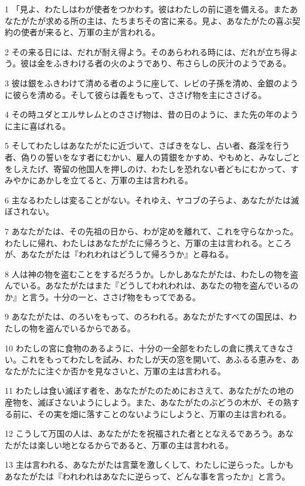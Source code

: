 \par 1 「見よ、わたしはわが使者をつかわす。彼はわたしの前に道を備える。またあなたがたが求める所の主は、たちまちその宮に来る。見よ、あなたがたの喜ぶ契約の使者が来ると、万軍の主が言われる。
\par 2 その来る日には、だれが耐え得よう。そのあらわれる時には、だれが立ち得よう。彼は金をふきわける者の火のようであり、布さらしの灰汁のようである。
\par 3 彼は銀をふきわけて清める者のように座して、レビの子孫を清め、金銀のように彼らを清める。そして彼らは義をもって、ささげ物を主にささげる。
\par 4 その時ユダとエルサレムとのささげ物は、昔の日のように、また先の年のように主に喜ばれる。
\par 5 そしてわたしはあなたがたに近づいて、さばきをなし、占い者、姦淫を行う者、偽りの誓いをなす者にむかい、雇人の賃銀をかすめ、やもめと、みなしごとをしえたげ、寄留の他国人を押しのけ、わたしを恐れない者どもにむかって、すみやかにあかしを立てると、万軍の主は言われる。
\par 6 主なるわたしは変ることがない。それゆえ、ヤコブの子らよ、あなたがたは滅ぼされない。
\par 7 あなたがたは、その先祖の日から、わが定めを離れて、これを守らなかった。わたしに帰れ、わたしはあなたがたに帰ろうと、万軍の主は言われる。ところが、あなたがたは『われわれはどうして帰ろうか』と尋ねる。
\par 8 人は神の物を盗むことをするだろうか。しかしあなたがたは、わたしの物を盗んでいる。あなたがたはまた『どうしてわれわれは、あなたの物を盗んでいるのか』と言う。十分の一と、ささげ物をもってである。
\par 9 あなたがたは、のろいをもって、のろわれる。あなたがたすべての国民は、わたしの物を盗んでいるからである。
\par 10 わたしの宮に食物のあるように、十分の一全部をわたしの倉に携えてきなさい。これをもってわたしを試み、わたしが天の窓を開いて、あふるる恵みを、あなたがたに注ぐか否かを見なさいと、万軍の主は言われる。
\par 11 わたしは食い滅ぼす者を、あなたがたのためにおさえて、あなたがたの地の産物を、滅ぼさないようにしよう。また、あなたがたのぶどうの木が、その熟する前に、その実を畑に落すことのないようにしようと、万軍の主は言われる。
\par 12 こうして万国の人は、あなたがたを祝福された者ととなえるであろう。あなたがたは楽しい地となるからであると、万軍の主は言われる。
\par 13 主は言われる、あなたがたは言葉を激しくして、わたしに逆らった。しかもあなたがたは『われわれはあなたに逆らって、どんな事を言ったか』と言う。
